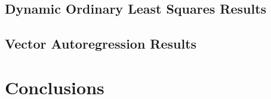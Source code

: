 \documentclass[review]{elsarticle}
\begin{document}
    \subsection{Dynamic Ordinary Least Squares Results}

    \subsection{Vector Autoregression Results}

    \section{Conclusions}


    

    
    
    
\end{document}
